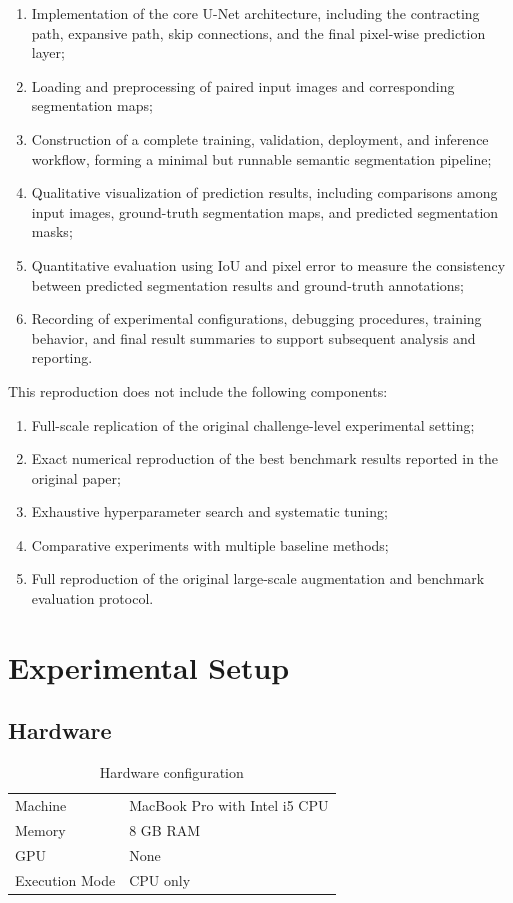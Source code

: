 \documentclass[11pt]{article}
\begin{document}
\begin{enumerate}[leftmargin=1.5em]
    \item Implementation of the core U-Net architecture, including the contracting path, expansive path, skip connections, and the final pixel-wise prediction layer;
    \item Loading and preprocessing of paired input images and corresponding segmentation maps;
    \item Construction of a complete training, validation, deployment, and inference workflow, forming a minimal but runnable semantic segmentation pipeline;
    \item Qualitative visualization of prediction results, including comparisons among input images, ground-truth segmentation maps, and predicted segmentation masks;
    \item Quantitative evaluation using IoU and pixel error to measure the consistency between predicted segmentation results and ground-truth annotations;
    \item Recording of experimental configurations, debugging procedures, training behavior, and final result summaries to support subsequent analysis and reporting.
\end{enumerate}

This reproduction does not include the following components:

\begin{enumerate}[leftmargin=1.5em]
    \item Full-scale replication of the original challenge-level experimental setting;
    \item Exact numerical reproduction of the best benchmark results reported in the original paper;
    \item Exhaustive hyperparameter search and systematic tuning;
    \item Comparative experiments with multiple baseline methods;
    \item Full reproduction of the original large-scale augmentation and benchmark evaluation protocol.
\end{enumerate}

\section{Experimental Setup}

\subsection{Hardware}
\begin{table}[H]
\centering
\caption{Hardware configuration}
\begin{tabular}{ll}
\toprule
Machine & MacBook Pro with Intel i5 CPU \\
Memory & 8 GB RAM \\
GPU & None \\
Execution Mode & CPU only \\
\bottomrule
\end{tabular}
\end{table}
\end{document}
